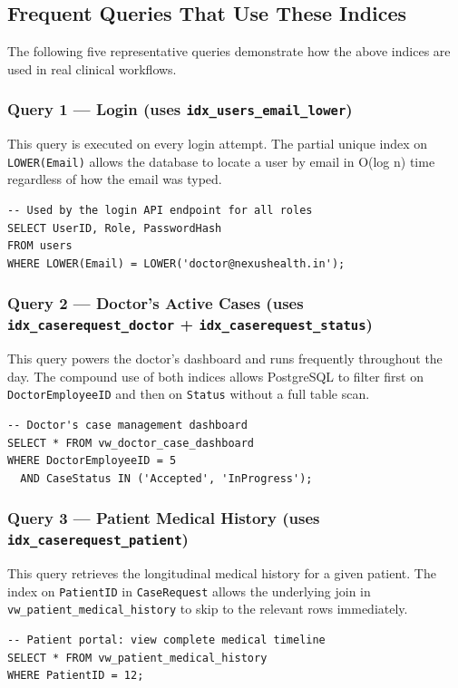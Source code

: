 \documentclass{article}
\begin{document}
\subsection{Frequent Queries That Use These Indices}

The following five representative queries demonstrate how the above indices are used in real clinical workflows.

\subsubsection{Query 1 --- Login (uses \texttt{idx\_users\_email\_lower})}
This query is executed on every login attempt. The partial unique index on \texttt{LOWER(Email)} allows the database to locate a user by email in O(log n) time regardless of how the email was typed.

\begin{lstlisting}
-- Used by the login API endpoint for all roles
SELECT UserID, Role, PasswordHash
FROM users
WHERE LOWER(Email) = LOWER('doctor@nexushealth.in');
\end{lstlisting}

\subsubsection{Query 2 --- Doctor's Active Cases (uses \texttt{idx\_caserequest\_doctor} + \texttt{idx\_caserequest\_status})}
This query powers the doctor's dashboard and runs frequently throughout the day. The compound use of both indices allows PostgreSQL to filter first on \texttt{DoctorEmployeeID} and then on \texttt{Status} without a full table scan.

\begin{lstlisting}
-- Doctor's case management dashboard
SELECT * FROM vw_doctor_case_dashboard
WHERE DoctorEmployeeID = 5
  AND CaseStatus IN ('Accepted', 'InProgress');
\end{lstlisting}

\subsubsection{Query 3 --- Patient Medical History (uses \texttt{idx\_caserequest\_patient})}
This query retrieves the longitudinal medical history for a given patient. The index on \texttt{PatientID} in \texttt{CaseRequest} allows the underlying join in \texttt{vw\_patient\_medical\_history} to skip to the relevant rows immediately.

\begin{lstlisting}
-- Patient portal: view complete medical timeline
SELECT * FROM vw_patient_medical_history
WHERE PatientID = 12;
\end{lstlisting}
\end{document}
